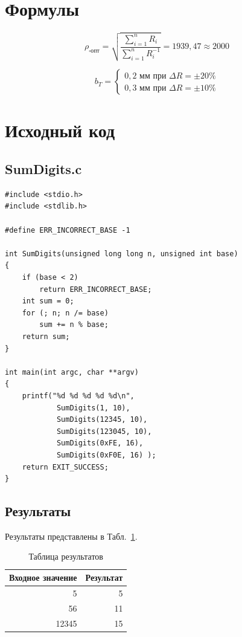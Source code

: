 \documentclass[12pt, a4paper]{article}
\begin{document}
\section{Формулы}

$$\rho_{\square\textrm{опт}}=\sqrt{\frac{\sum\limits_{i=1}^{n} R_{i}}{\sum\limits_{i=1}^{n} R_{i}^{-1}}} = 1939,47 \approx 2000$$

$$b_T = \left\{ \begin{matrix} 0,2 \textrm{ мм при } \Delta R = \pm 20\% \\
0,3 \textrm{ мм при } \Delta R = \pm 10\%\end{matrix} \right. $$

\section{Исходный код}

\subsection{SumDigits.c}
\begin{verbatim}
#include <stdio.h>
#include <stdlib.h>

#define ERR_INCORRECT_BASE -1

int SumDigits(unsigned long long n, unsigned int base)
{
    if (base < 2)
        return ERR_INCORRECT_BASE;
    int sum = 0;
    for (; n; n /= base)
        sum += n % base;
    return sum;
}

int main(int argc, char **argv)
{
    printf("%d %d %d %d %d\n",
            SumDigits(1, 10),
            SumDigits(12345, 10),
            SumDigits(123045, 10),
            SumDigits(0xFE, 16),
            SumDigits(0xF0E, 16) );
    return EXIT_SUCCESS;
}
\end{verbatim}

\subsection{Результаты}
Результаты представлены в Табл.~\ref{table:results}.
\begin{table}[H]
\caption{Таблица результатов}
\centering
\begin{tabular}{| r | r |}
\hline
Входное значение & Результат \\ \hline
5 & 5 \\ \hline
56 & 11 \\ \hline
12345 & 15 \\ \hline
\end{tabular}
\label{table:results}
\end{table}
\end{document}
